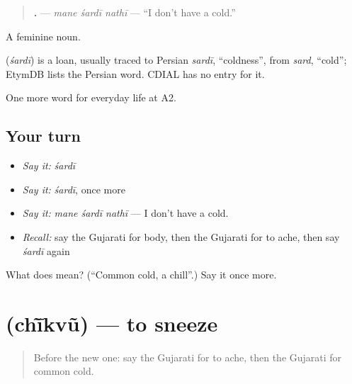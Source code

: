 \begin{quote}
\textbf{  .} — \emph{mane śardī nathī} — \textquotedblleft{}I don't have a cold.\textquotedblright{}
\end{quote}

A feminine noun.

\begin{cousinweb}
\textbf{} (\emph{śardī}) is a loan, usually traced to Persian \emph{sardī}, \textquotedblleft{}coldness\textquotedblright{}, from \emph{sard}, \textquotedblleft{}cold\textquotedblright{}; EtymDB lists the Persian word. CDIAL has no entry for it.
\end{cousinweb}

\begin{grammarlens}[title={What you've built}]
One more word for everyday life at A2.
\end{grammarlens}

\subsection*{Your turn}
\begin{itemize}
\raggedright
  \item \emph{Say it:} \emph{śardī}
  \item \emph{Say it:} \emph{śardī}, once more
  \item \emph{Say it:} \emph{mane śardī nathī} — I don't have a cold.
  \item \emph{Recall:} say the Gujarati for body, then the Gujarati for to ache, then say \emph{śardī} again
\end{itemize}

\begin{tcolorbox}[breakable,colback=teal!4,colframe=teal!35!black,title={Before you move on}]
What does  mean? (\textquotedblleft{}Common cold, a chill\textquotedblright{}.) Say it once more.
\end{tcolorbox}
\section[\texorpdfstring{\gu{છીંકવું} (chī̃kvũ)}{છીંકવું (chī̃kvũ)}]{ (chī̃kvũ) — to sneeze}

\label{lesson:GU-C223-chikvu}



\begin{quote}
Before the new one: say the Gujarati for to ache, then the Gujarati for common cold.
\end{quote}

